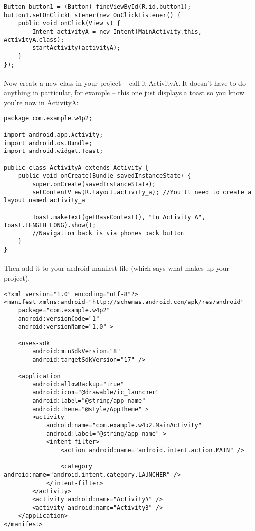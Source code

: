 \begin{lstlisting}
Button button1 = (Button) findViewById(R.id.button1);
button1.setOnClickListener(new OnClickListener() {
	public void onClick(View v) {
		Intent activityA = new Intent(MainActivity.this, ActivityA.class);
		startActivity(activityA);
	}
});
\end{lstlisting}

\paragraph{} Now create a new class in your project – call it ActivityA. It doesn’t have to do anything in particular, for example – this one just displays a toast so you know you’re now in ActivityA:

\begin{lstlisting}
package com.example.w4p2;

import android.app.Activity;
import android.os.Bundle;
import android.widget.Toast;

public class ActivityA extends Activity {
	public void onCreate(Bundle savedInstanceState) {
		super.onCreate(savedInstanceState);
		setContentView(R.layout.activity_a); //You'll need to create a layout named activity_a
		
		Toast.makeText(getBaseContext(), "In Activity A", Toast.LENGTH_LONG).show();
		//Navigation back is via phones back button
	}
}
\end{lstlisting}

\paragraph{} Then add it to your android manifest file (which says what makes up your project).

\begin{lstlisting}
<?xml version="1.0" encoding="utf-8"?>
<manifest xmlns:android="http://schemas.android.com/apk/res/android"
    package="com.example.w4p2"
    android:versionCode="1"
    android:versionName="1.0" >

    <uses-sdk
        android:minSdkVersion="8"
        android:targetSdkVersion="17" />

    <application
        android:allowBackup="true"
        android:icon="@drawable/ic_launcher"
        android:label="@string/app_name"
        android:theme="@style/AppTheme" >
        <activity
            android:name="com.example.w4p2.MainActivity"
            android:label="@string/app_name" >
            <intent-filter>
                <action android:name="android.intent.action.MAIN" />

                <category android:name="android.intent.category.LAUNCHER" />
            </intent-filter>
        </activity>
        <activity android:name="ActivityA" />
        <activity android:name="ActivityB" />
    </application>
</manifest>
\end{lstlisting}

